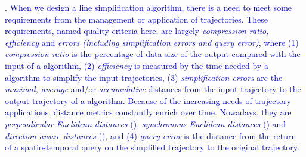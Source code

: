 . 
\textcolor{blue}{When we design a line simplification algorithm, there is a need to meet some requirements from the management or application of trajectories. These requirements, named quality criteria here, are largely \emph{compression ratio, efficiency} and \emph{errors (including simplification errors and query error)}, where 
(1) \emph{compression ratio} is the percentage of data size of the output compared with the input of a \lsa algorithm, 
(2) \emph{efficiency} is measured by the time needed by a \lsa algorithm to simplify the input trajectories,
(3) \emph{simplification errors} are the \emph{maximal, average} and/or \emph{accumulative} distances from the input trajectory to the output trajectory of a \lsa algorithm. Because of the increasing needs of trajectory applications, distance metrics constantly enrich over time. Nowadays, they are \emph{perpendicular Euclidean distances} (\ped), \emph{synchronous Euclidean distances} (\sed) and \emph{direction-aware distances} (\dad), and}
\textcolor{blue}{(4) \emph{query error} is the distance from the return of a spatio-temporal query \cite{Meratnia:Spatiotemporal, Lin:Cised} on the simplified trajectory to the original trajectory.}




